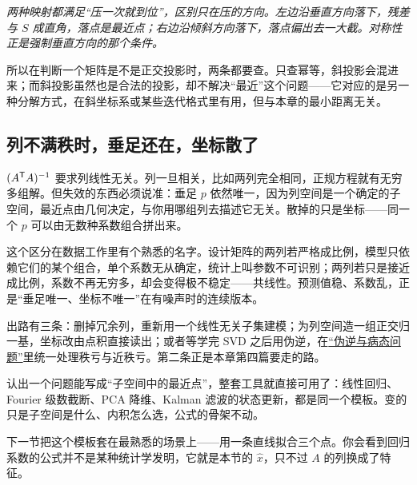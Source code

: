 \begin{center}

\emph{两种映射都满足``压一次就到位''，区别只在压的方向。左边沿垂直方向落下，残差与 \(S\) 成直角，落点是最近点；右边沿倾斜方向落下，落点偏出去一大截。对称性正是强制垂直方向的那个条件。}
\end{center}

所以在判断一个矩阵是不是正交投影时，两条都要查。只查幂等，斜投影会混进来；而斜投影虽然也是合法的投影，却不解决``最近''这个问题——它对应的是另一种分解方式，在斜坐标系或某些迭代格式里有用，但与本章的最小距离无关。

\subsection{列不满秩时，垂足还在，坐标散了}

\((A^{\mathsf{T}}A)^{-1}\) 要求列线性无关。列一旦相关，比如两列完全相同，正规方程就有无穷多组解。但失效的东西必须说准：垂足 \(p\) 依然唯一，因为列空间是一个确定的子空间，最近点由几何决定，与你用哪组列去描述它无关。散掉的只是坐标——同一个 \(p\) 可以由无数种系数组合拼出来。

这个区分在数据工作里有个熟悉的名字。设计矩阵的两列若严格成比例，模型只依赖它们的某个组合，单个系数无从确定，统计上叫参数不可识别；两列若只是接近成比例，系数不再无穷多，却会变得极不稳定——共线性。预测值稳、系数乱，正是``垂足唯一、坐标不唯一''在有噪声时的连续版本。

出路有三条：删掉冗余列，重新用一个线性无关子集建模；为列空间造一组正交归一基，坐标改由点积直接读出；或者等学完 SVD 之后用伪逆，在\hyperref[sec:03-Linear-Algebra/07-SVD-and-Data-Applications/02]{``伪逆与病态问题''}里统一处理秩亏与近秩亏。第二条正是本章第四篇要走的路。

认出一个问题能写成``子空间中的最近点''，整套工具就直接可用了：线性回归、Fourier 级数截断、PCA 降维、Kalman 滤波的状态更新，都是同一个模板。变的只是子空间是什么、内积怎么选，公式的骨架不动。

下一节把这个模板套在最熟悉的场景上——用一条直线拟合三个点。你会看到回归系数的公式并不是某种统计学发明，它就是本节的 \(\hat x\)，只不过 \(A\) 的列换成了特征。
